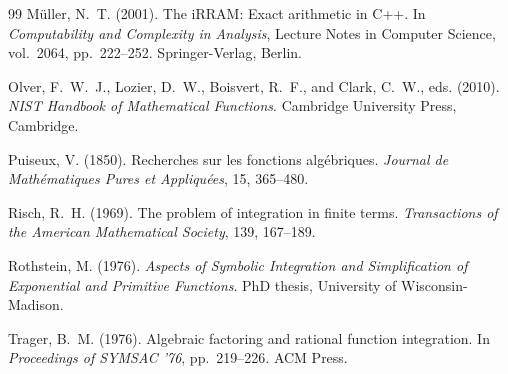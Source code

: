 \documentclass[12pt]{article}
\begin{document}
\begin{thebibliography}{99}
M\"{u}ller, N.~T. (2001).
The i{RRAM}: Exact arithmetic in {C}++.
In \emph{Computability and Complexity in Analysis},
Lecture Notes in Computer Science, vol.~2064, pp.~222--252.
Springer-Verlag, Berlin.

Olver, F.~W.~J., Lozier, D.~W., Boisvert, R.~F., and Clark, C.~W., eds. (2010).
\emph{{NIST} Handbook of Mathematical Functions}.
Cambridge University Press, Cambridge.

Puiseux, V. (1850).
Recherches sur les fonctions alg\'{e}briques.
\emph{Journal de Math\'{e}matiques Pures et Appliqu\'{e}es}, 15, 365--480.

Risch, R.~H. (1969).
The problem of integration in finite terms.
\emph{Transactions of the American Mathematical Society}, 139, 167--189.

Rothstein, M. (1976).
\emph{Aspects of Symbolic Integration and Simplification of Exponential and Primitive Functions}.
PhD thesis, University of Wisconsin-Madison.

Trager, B.~M. (1976).
Algebraic factoring and rational function integration.
In \emph{Proceedings of {SYMSAC} '76}, pp.~219--226. ACM Press.

\end{thebibliography}
\end{document}
